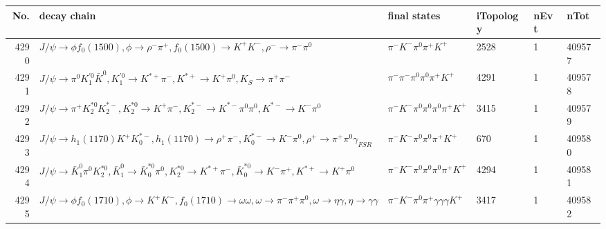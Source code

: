\begin{table}[htbp] 
\begin{center}
\begin{small}
\begin{tabular}{rlllll}\hline\hline
 No. & decay chain & final states &  iTopology & nEvt & nTot \\\hline
4290&$J/\psi       \rightarrow \phi           f_{0}(1500)    , \phi            \rightarrow \rho^{-}      \pi^{+}        , f_{0}(1500)     \rightarrow K^{+}          K^{-}          , \rho^{-}       \rightarrow \pi^{-}        \pi^{0}        $&$\pi^{-}        K^{-}          \pi^{0}        \pi^{+}        K^{+}          $& 2528&    1&409577\\
4291&$J/\psi       \rightarrow \pi^{0}        K_1^{'0}      \bar{K}^{0}   , K_1^{'0}       \rightarrow K^{*+}         \pi^{-}        , K^{*+}          \rightarrow K^{+}          \pi^{0}        , K_{S}           \rightarrow \pi^{+}        \pi^{-}        $&$\pi^{-}        \pi^{-}        \pi^{0}        \pi^{0}        \pi^{+}        K^{+}          $& 4291&    1&409578\\
4292&$J/\psi       \rightarrow \pi^{+}        K_2^{*0}       K_2^{*-}       , K_2^{*0}        \rightarrow K^{+}          \pi^{-}        , K_2^{*-}        \rightarrow K^{*-}         \pi^{0}        \pi^{0}        , K^{*-}          \rightarrow K^{-}          \pi^{0}        $&$\pi^{-}        K^{-}          \pi^{0}        \pi^{0}        \pi^{0}        \pi^{+}        K^{+}          $& 3415&    1&409579\\
4293&$J/\psi       \rightarrow h_{1}(1170)    K^{+}          K_{0}^{*-}     , h_{1}(1170)     \rightarrow \rho^{+}      \pi^{-}        , K_{0}^{*-}      \rightarrow K^{-}          \pi^{0}        , \rho^{+}       \rightarrow \pi^{+}        \pi^{0}        \gamma_{FSR} $&$\pi^{-}        K^{-}          \pi^{0}        \pi^{0}        \pi^{+}        K^{+}          $&  670&    1&409580\\
4294&$J/\psi       \rightarrow \bar{K}_1^{0} \pi^{0}        K_2^{*0}       , \bar{K}_1^{0}  \rightarrow \bar{K}_0^{*0}\pi^{0}        , K_2^{*0}        \rightarrow K^{*+}         \pi^{-}        , \bar{K}_0^{*0} \rightarrow K^{-}          \pi^{+}        , K^{*+}          \rightarrow K^{+}          \pi^{0}        $&$\pi^{-}        K^{-}          \pi^{0}        \pi^{0}        \pi^{0}        \pi^{+}        K^{+}          $& 4294&    1&409581\\
4295&$J/\psi       \rightarrow \phi           f_{0}(1710)    , \phi            \rightarrow K^{+}          K^{-}          , f_{0}(1710)     \rightarrow \omega         \omega         , \omega          \rightarrow \pi^{-}        \pi^{+}        \pi^{0}        , \omega          \rightarrow \eta          \gamma       , \eta           \rightarrow \gamma       \gamma       $&$\pi^{-}        K^{-}          \pi^{0}        \pi^{+}        \gamma       \gamma       \gamma       K^{+}          $& 3417&    1&409582\\

\end{tabular}
\end{small}
\end{center}
\end{table}
